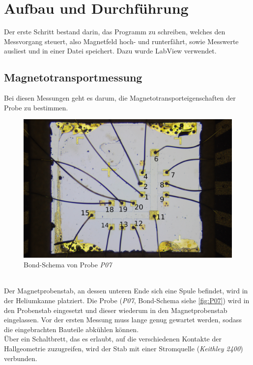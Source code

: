\section{Aufbau und Durchführung}
Der erste Schritt bestand darin, das Programm zu schreiben, welches den Messvorgang steuert, also Magnetfeld hoch- und runterfährt, sowie Messwerte ausliest und in einer Datei speichert. Dazu wurde LabView verwendet.

\subsection{Magnetotransportmessung}\label{sec:Magnetotransport}
Bei diesen Messungen geht es darum, die Magnetotransporteigenschaften der Probe zu bestimmen.

\begin{figure}

\includegraphics[scale=0.04]{Pictures/P07BondSchema.jpg}
\caption{Bond-Schema von Probe \emph{P07}}

\label{fig:P07}

\end{figure}
\hfill\\
Der Magnetprobenstab, an dessen unteren Ende sich eine Spule befindet, wird in der Heliumkanne platziert.
Die Probe (\emph{P07}, Bond-Schema siehe \autoref{fig:P07}) wird in den Probenstab eingesetzt und dieser wiederum in den Magnetprobenstab eingelassen.
Vor der ersten Messung muss lange genug gewartet werden, sodass die eingebrachten Bauteile abkühlen können.\\
Über ein Schaltbrett, das es erlaubt, auf die verschiedenen Kontakte der Hallgeometrie zuzugreifen, wird der Stab mit einer Stromquelle (\emph{Keithley 2400}) verbunden.

